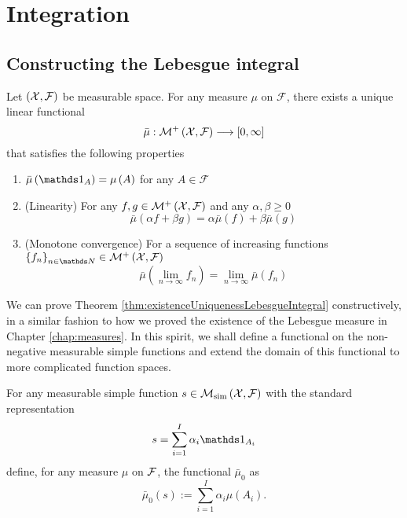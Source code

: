 
\chapter{Integration\label{chap:integration}}

\section{Constructing the Lebesgue integral}
\begin{thm}
\label{thm:existenceUniquenessLebesgueIntegral}Let $\left(\mathcal{X},\mathcal{F}\right)$
be measurable space. For any measure $\mu$ on $\mathcal{F}$, there
exists a unique linear functional
\[
\bar{\mu}:\mathcal{\mathcal{M}^{+}}\left(\mathcal{X},\mathcal{F}\right)\longrightarrow\left[0,\infty\right]
\]
that satisfies the following properties

\begin{enumerate}[label=(\roman*),leftmargin=.1\linewidth,rightmargin=.4\linewidth]
	\item $ \bar{\mu}\left(\indicate_A\right) = \mu\left(A\right) $ for any $ A \in \mathcal{F} $
	\item \textnormal{(Linearity)}  For any $f,g\in \mathcal{\mathcal{M}^{+}}\left(\mathcal{X},\mathcal{F}\right)$ and any $\alpha,\beta \geq 0 $ 
	\[
				\bar{\mu}\left(\alpha f + \beta g\right) = \alpha \bar{\mu}\left(f\right) + \beta \bar{\mu}\left(g\right)                
	\]
	\item \textnormal{(Monotone convergence)} For a sequence of increasing functions $ \left\{f_n\right\}_{n\in\N} \in \mathcal{\mathcal{M}^{+}}\left(\X,\mathcal{F}\right)$ 
	\[
				\bar{\mu}\left(\lim_{n\to\infty}f_n\right) = \lim_{n\to\infty}\bar{\mu}\left(f_n\right)
	\]
\end{enumerate}
\end{thm}

We can prove Theorem \ref{thm:existenceUniquenessLebesgueIntegral}
constructively, in a similar fashion to how we proved the existence
of the Lebesgue measure in Chapter \ref{chap:measures}. In this spirit,
we shall define a functional on the non-negative measurable simple
functions and extend the domain of this functional to more complicated
function spaces.
\begin{defn}
\label{def:simpleFuncIntegral}For any measurable simple function
$s\in\mathcal{M}_{\textnormal{sim}}\left(\mathcal{X},\mathcal{F}\right)$ with the standard
representation
\[
s=\sum_{i=1}^{I}\alpha_{i}\indicate_{A_{i}}
\]
define, for any measure $\mu$ on $\mathcal{F}$, the functional $\bar{\mu}_{0}$
as
\[
\bar{\mu}_{0}\left(s\right):=\sum_{i=1}^{I}\alpha_{i}\mu\left(A_{i}\right).
\]
\end{defn}

